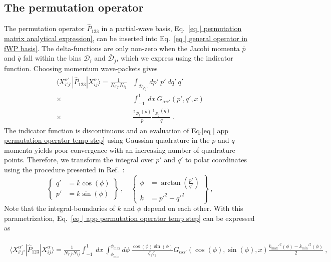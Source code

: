 \documentclass[aps,prc,showpacs,twocolumn,floatfix,nobibnotes,nofootinbib,amsmath,amssymb,longbibliography]{revtex4-2}
\begin{document}
\subsection{The permutation operator}
\label{app | WP permutation operator}
The permutation operator $\hat{P}_{123}$ in a partial-wave basis,
Eq.~\eqref{eq | permutation matrix analytical expression}, can be
inserted into Eq.~\eqref{eq | general operator in fWP basis}. The
delta-functions are only non-zero when the Jacobi momenta $\bar{p}$
and $\bar{q}$ fall within the bins $\mathcal{D}_i$ and
$\bar{\mathcal{D}}_j$, which we express using the indicator
function. Choosing momentum wave-packets gives
\begin{align}
	\begin{split}
	\langle X_{i'j'}^{\alpha'}|\hat{P}_{123}|X_{ij}^\alpha\rangle = \frac{1}{N_{i'j'}N_{ij}}&\int_{\mathcal{D}_{i'j'}} dp'\:p'\:dq'\:q'\\
	\times&\int_{-1}^1\:dx\: G_{\alpha\alpha'}(p',q',x)\\
	\times&\frac{\mathds{1}_{\mathcal{D}_j}(\bar{p})}{\bar{p}}\frac{\mathds{1}_{\bar{\mathcal{D}}_j}(\bar{q})}{\bar{q}}\:.
	\end{split}
\label{eq | app permutation operator temp step}
\end{align}
The indicator function is discontinuous and an evaluation of
Eq.\eqref{eq | app permutation operator temp step} using Gaussian
quadrature in the $p$ and $q$ momenta yields poor convergence with an
increasing number of quadrature points. Therefore, we transform the
integral over $p'$ and $q'$ to polar coordinates using the procedure
presented in Ref.~\cite{Pomerantsev:2014ija}:
\begin{equation}
\left.\begin{cases}
q' &= k\cos(\phi) \\
p' &= k\sin(\phi)
\end{cases}\right\} \:,\quad
\left.\begin{cases}
\phi &= \arctan\left(\frac{p'}{q'}\right) \\
k &= p'^2 + q'^2
\end{cases}\right\}\:,
\label{eq | parametrise p' and q'}
\end{equation}
Note that the integral-boundaries of $k$ and $\phi$ depend on each
other. With this parametrization, Eq.~\eqref{eq | app permutation
  operator temp step} can be expressed as
\begin{widetext}
\begin{align}
	\begin{split}
	\langle X_{i'j'}^{\alpha'}|\hat{P}_{123}|X_{ij}^\alpha\rangle =\frac{1}{N_{i'j'}N_{ij}}\int_{-1}^1\:dx\:\int_{\phi_{\text{min}}}^{\phi_{\text{max}}}d\phi\: \frac{\cos(\phi)\sin(\phi)}{\zeta_1\zeta_2}G_{\alpha\alpha'}(\cos(\phi),\sin(\phi),x)\frac{k_{\textrm{max}}'^2(\phi)-k_{\min}'^2(\phi)}{2} \:,
	\end{split}
	\label{eq | P123 in WPCD basis}
\end{align}
\end{widetext}
\end{document}
